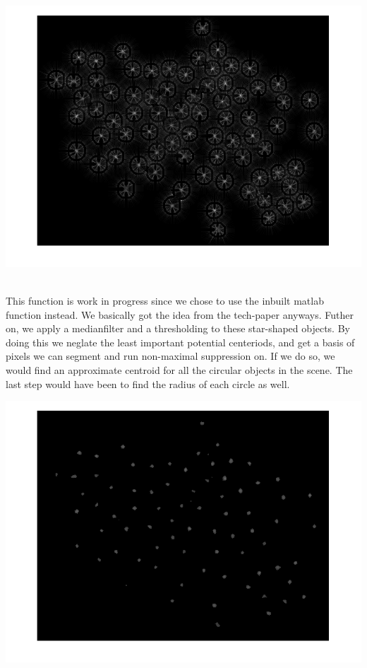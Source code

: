 \\
\centerline{\includegraphics[scale=0.3]{stars.png}}
\\
This function is work in progress since we chose to use the inbuilt matlab function instead. We basically got the idea from the tech-paper anyways. Futher on, we apply a medianfilter and a thresholding to these star-shaped objects. By doing this we neglate the least important potential centeriods, and get a basis of pixels we can segment and run non-maximal suppression on. If we do so, we would find an approximate centroid for all the circular objects in the scene. The last step would have been to find the radius of each circle as well. 
\\
\centerline{\includegraphics[scale=0.3]{dots.png}}

